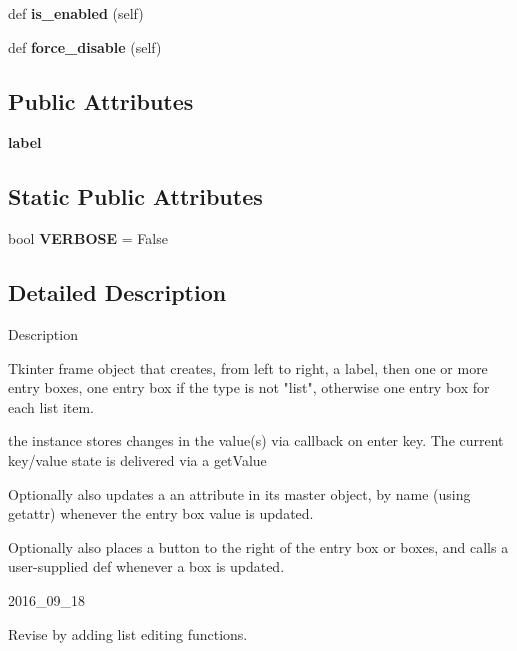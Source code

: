 \begin{DoxyCompactItemize}
\item 
def {\bfseries is\+\_\+enabled} (self)\hypertarget{classnegui_1_1pgkeyvalueframe_1_1KeyValFrame_a72501403a679b0ee3822cea7626bcff2}{}\label{classnegui_1_1pgkeyvalueframe_1_1KeyValFrame_a72501403a679b0ee3822cea7626bcff2}

\item 
def {\bfseries force\+\_\+disable} (self)\hypertarget{classnegui_1_1pgkeyvalueframe_1_1KeyValFrame_a09ba9b45311ca28cd4e975761542e3f9}{}\label{classnegui_1_1pgkeyvalueframe_1_1KeyValFrame_a09ba9b45311ca28cd4e975761542e3f9}

\end{DoxyCompactItemize}
\subsection*{Public Attributes}
\begin{DoxyCompactItemize}
\item 
{\bfseries label}\hypertarget{classnegui_1_1pgkeyvalueframe_1_1KeyValFrame_a530e52fc0ef515f23995721a12a023fe}{}\label{classnegui_1_1pgkeyvalueframe_1_1KeyValFrame_a530e52fc0ef515f23995721a12a023fe}

\end{DoxyCompactItemize}
\subsection*{Static Public Attributes}
\begin{DoxyCompactItemize}
\item 
bool {\bfseries V\+E\+R\+B\+O\+SE} = False\hypertarget{classnegui_1_1pgkeyvalueframe_1_1KeyValFrame_a87c8cf8185b7653b59fb4ee3722845f0}{}\label{classnegui_1_1pgkeyvalueframe_1_1KeyValFrame_a87c8cf8185b7653b59fb4ee3722845f0}

\end{DoxyCompactItemize}


\subsection{Detailed Description}
\begin{DoxyVerb}Description

Tkinter frame object that creates,
from left to right, a label, then 
one or more entry boxes, one entry box 
if the type is not "list", otherwise one 
entry box for each list item.

the instance stores changes in the value(s)
via callback on enter key.  The current
key/value state is delivered via a getValue

Optionally also updates a an attribute
in its master object, by name (using getattr)
whenever the entry box value is updated.

Optionally also places a button to the right
of the entry box or boxes, and calls a user-supplied
def whenever a box is updated.

2016_09_18

Revise by adding list editing functions.\end{DoxyVerb}
 

